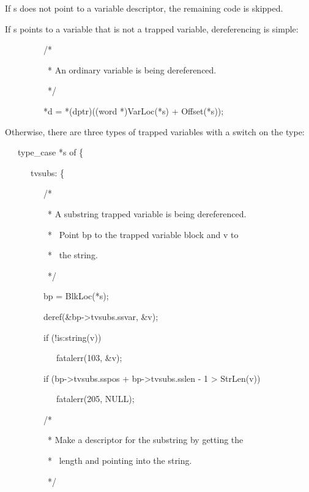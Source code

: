 \noindent
If s does not point to a variable descriptor, the remaining code is skipped.

If s points to a variable that is not a trapped variable,
dereferencing is simple:

{\ttfamily\mdseries
\ \ \ \ \ \ \ \ \ /*}

{\ttfamily\mdseries
\ \ \ \ \ \ \ \ \ \ * An ordinary variable is being dereferenced.}

{\ttfamily\mdseries
\ \ \ \ \ \ \ \ \ \ */}

{\ttfamily\mdseries
\ \ \ \ \ \ \ \ \ *d = *(dptr)((word *)VarLoc(*s) + Offset(*s));}


Otherwise, there are three types of trapped variables with a switch on the type:

{\ttfamily\mdseries
\ \ \ type\_case *s of \{}

{\ttfamily\mdseries
\ \ \ \ \ \ tvsubs: \{}

{\ttfamily\mdseries
\ \ \ \ \ \ \ \ \ /*}

{\ttfamily\mdseries
\ \ \ \ \ \ \ \ \ \ * A substring trapped variable is being dereferenced.}

{\ttfamily\mdseries
\ \ \ \ \ \ \ \ \ \ * \ Point bp to the trapped variable block and v to}

{\ttfamily\mdseries
\ \ \ \ \ \ \ \ \ \ * \ the string.}

{\ttfamily\mdseries
\ \ \ \ \ \ \ \ \ \ */}

{\ttfamily\mdseries
\ \ \ \ \ \ \ \ \ bp = BlkLoc(*s);}

{\ttfamily\mdseries
\ \ \ \ \ \ \ \ \ deref(\&bp-{\textgreater}tvsubs.ssvar, \&v);}

{\ttfamily\mdseries
\ \ \ \ \ \ \ \ \ if (!is:string(v))}

{\ttfamily\mdseries
\ \ \ \ \ \ \ \ \ \ \ \ fatalerr(103, \&v);}

{\ttfamily\mdseries
\ \ \ \ \ \ \ \ \ if (bp-{\textgreater}tvsubs.sspos + bp-{\textgreater}tvsubs.sslen - 1 {\textgreater} StrLen(v))}

{\ttfamily\mdseries
\ \ \ \ \ \ \ \ \ \ \ \ fatalerr(205, NULL);}

{\ttfamily\mdseries
\ \ \ \ \ \ \ \ \ /*}

{\ttfamily\mdseries
\ \ \ \ \ \ \ \ \ \ * Make a descriptor for the substring by getting the}

{\ttfamily\mdseries
\ \ \ \ \ \ \ \ \ \ * \ length and pointing into the string.}

{\ttfamily\mdseries
\ \ \ \ \ \ \ \ \ \ */}

